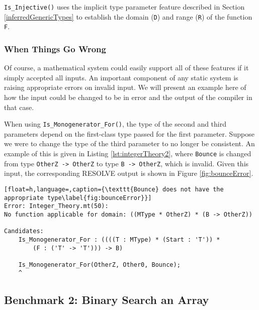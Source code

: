 \texttt{Is\_Injective()} uses the implicit type parameter feature described in Section \ref{inferredGenericTypes} to establish the domain (\texttt{D}) and range (\texttt{R}) of the function \texttt{F}.

		\subsubsection{When Things Go Wrong}	%

Of course, a mathematical system could easily support all of these features if it simply accepted all inputs.  An important component of any static system is raising appropriate errors on invalid input.  We will present an example here of how the input could be changed to be in error and the output of the compiler in that case.

When using \texttt{Is\_Monogenerator\_For()}, the type of the second and third parameters depend on the first-class type passed for the first parameter.  Suppose we were to change the type of the third parameter to no longer be consistent.  An example of this is given in Listing \ref{lst:integerTheory2}, where \texttt{Bounce} is changed from type \texttt{OtherZ -> OtherZ} to type \texttt{B -> OtherZ}, which is invalid.  Given this input, the corresponding RESOLVE output is shown in Figure \ref{fig:bounceError}.



\begin{lstlisting}[float=h,language=,caption={\texttt{Bounce} does not have the appropriate type\label{fig:bounceError}}]
Error: Integer_Theory.mt(50):
No function applicable for domain: ((MType * OtherZ) * (B -> OtherZ))

Candidates:
	Is_Monogenerator_For : ((((T : MType) * (Start : 'T')) * 
		(F : ('T' -> 'T'))) -> B)

	Is_Monogenerator_For(OtherZ, Other0, Bounce);
	^
\end{lstlisting}


	\subsection{Benchmark 2: Binary Search an Array}	%

